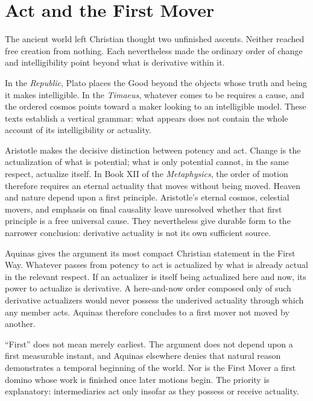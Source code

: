 \section{Act and the First Mover}

The ancient world left Christian thought two unfinished ascents. Neither reached free creation from nothing. Each nevertheless made the ordinary order of change and intelligibility point beyond what is derivative within it.

In the \emph{Republic}, Plato places the Good beyond the objects whose truth and being it makes intelligible. In the \emph{Timaeus}, whatever comes to be requires a cause, and the ordered cosmos points toward a maker looking to an intelligible model. These texts establish a vertical grammar: what appears does not contain the whole account of its intelligibility or actuality.

Aristotle makes the decisive distinction between potency and act. Change is the actualization of what is potential; what is only potential cannot, in the same respect, actualize itself. In Book XII of the \emph{Metaphysics}, the order of motion therefore requires an eternal actuality that moves without being moved. Heaven and nature depend upon a first principle. Aristotle's eternal cosmos, celestial movers, and emphasis on final causality leave unresolved whether that first principle is a free universal cause. They nevertheless give durable form to the narrower conclusion: derivative actuality is not its own sufficient source.

Aquinas gives the argument its most compact Christian statement in the First Way. Whatever passes from potency to act is actualized by what is already actual in the relevant respect. If an actualizer is itself being actualized here and now, its power to actualize is derivative. A here-and-now order composed only of such derivative actualizers would never possess the underived actuality through which any member acts. Aquinas therefore concludes to a first mover not moved by another.

``First'' does not mean merely earliest. The argument does not depend upon a first measurable instant, and Aquinas elsewhere denies that natural reason demonstrates a temporal beginning of the world. Nor is the First Mover a first domino whose work is finished once later motions begin. The priority is explanatory: intermediaries act only insofar as they possess or receive actuality.

